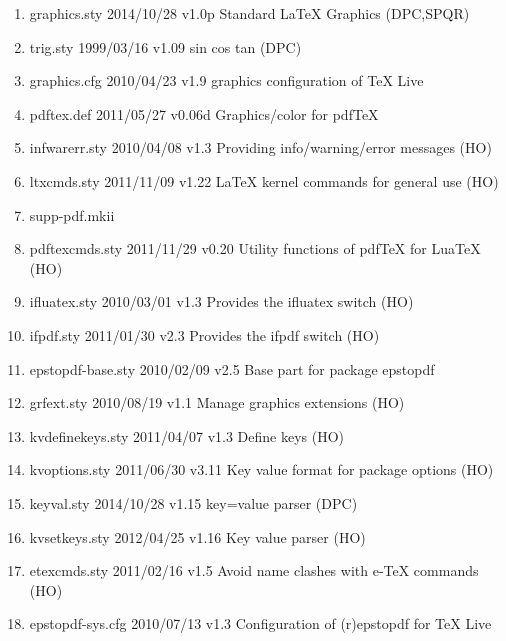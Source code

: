 \begin{enumerate}
\item graphics.sty 2014/10/28 v1.0p Standard LaTeX Graphics (DPC,SPQR)
\item trig.sty 1999/03/16 v1.09 sin cos tan (DPC)
\item graphics.cfg 2010/04/23 v1.9 graphics configuration of TeX Live
\item pdftex.def 2011/05/27 v0.06d Graphics/color for pdfTeX
\item infwarerr.sty 2010/04/08 v1.3 Providing info/warning/error messages (HO)
\item ltxcmds.sty 2011/11/09 v1.22 LaTeX kernel commands for general use (HO)
\item supp-pdf.mkii
\item pdftexcmds.sty 2011/11/29 v0.20 Utility functions of pdfTeX for LuaTeX (HO)
\item ifluatex.sty 2010/03/01 v1.3 Provides the ifluatex switch (HO)
\item ifpdf.sty 2011/01/30 v2.3 Provides the ifpdf switch (HO)
\item epstopdf-base.sty 2010/02/09 v2.5 Base part for package epstopdf
\item grfext.sty 2010/08/19 v1.1 Manage graphics extensions (HO)
\item kvdefinekeys.sty 2011/04/07 v1.3 Define keys (HO)
\item kvoptions.sty 2011/06/30 v3.11 Key value format for package options (HO)
\item keyval.sty 2014/10/28 v1.15 key=value parser (DPC)
\item kvsetkeys.sty 2012/04/25 v1.16 Key value parser (HO)
\item etexcmds.sty 2011/02/16 v1.5 Avoid name clashes with e-TeX commands (HO)
\item epstopdf-sys.cfg 2010/07/13 v1.3 Configuration of (r)epstopdf for TeX Live
\end{enumerate}	
